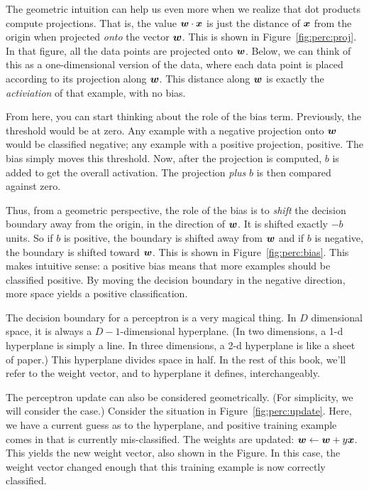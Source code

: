 The geometric intuition can help us even more when we realize that
dot products compute projections.  That is, the value ${\boldsymbol{w}} \cdot {\boldsymbol{x}}$
is just the distance of ${\boldsymbol{x}}$ from the origin when projected
\emph{onto} the vector ${\boldsymbol{w}}$.  This is shown in
Figure~\ref{fig:perc:proj}.  In that figure, all the data points are
projected onto ${\boldsymbol{w}}$.  Below, we can think of this as a
one-dimensional version of the data, where each data point is placed
according to its projection along ${\boldsymbol{w}}$.  This distance along ${\boldsymbol{w}}$ is
exactly the \emph{activiation} of that example, with no bias.

From here, you can start thinking about the role of the bias term.
Previously, the threshold would be at zero.  Any example with a
negative projection onto ${\boldsymbol{w}}$ would be classified negative; any
example with a positive projection, positive.  The bias simply moves
this threshold.  Now, after the projection is computed, $b$ is added
to get the overall activation.  The projection \emph{plus} $b$ is then
compared against zero.


Thus, from a geometric perspective, the role of the bias is to
\emph{shift} the decision boundary away from the origin, in the
direction of ${\boldsymbol{w}}$.  It is shifted exactly $-b$ units.  So if $b$ is
positive, the boundary is shifted away from ${\boldsymbol{w}}$ and if $b$ is
negative, the boundary is shifted toward ${\boldsymbol{w}}$.  This is shown in
Figure~\ref{fig:perc:bias}.  This makes intuitive sense: a positive
bias means that more examples should be classified positive.  By
moving the decision boundary in the negative direction, more space
yields a positive classification.

The decision boundary for a perceptron is a very magical thing.  In
$D$ dimensional space, it is always a $D-1$-dimensional hyperplane.
(In two dimensions, a 1-d hyperplane is simply a line.  In three
dimensions, a 2-d hyperplane is like a sheet of paper.)  This
hyperplane divides space in half.  In the rest of this book, we'll
refer to the weight vector, and to hyperplane it defines,
interchangeably.


The perceptron update can also be considered geometrically.  (For
simplicity, we will consider the  case.)  Consider
the situation in Figure~\ref{fig:perc:update}.  Here, we have a current
guess as to the hyperplane, and positive training example comes in
that is currently mis-classified.  The weights are updated: ${\boldsymbol{w}}
\leftarrow {\boldsymbol{w}} + y {\boldsymbol{x}}$.  This yields the new weight vector, also
shown in the Figure.  In this case, the weight vector changed enough
that this training example is now correctly classified.

